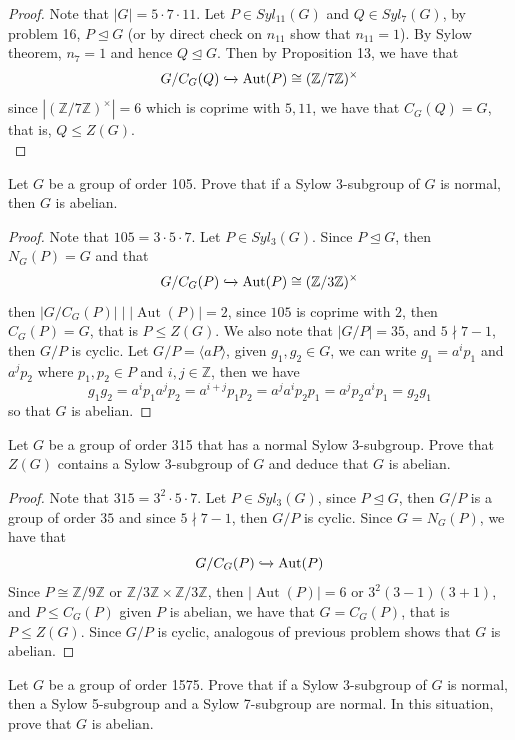 \documentclass{article}
\newcommand{\Z}{\mathbb{Z}}
\newenvironment{problem}[2][Problem]{\begin{trivlist}
\item[\hskip \labelsep {\bfseries #1}\hskip \labelsep {\bfseries #2.}]}{\end{trivlist}}
\DeclareMathOperator{\Aut}{Aut}
\begin{document}
\begin{proof}
    Note that $|G|=5\cdot 7 \cdot 11$. Let $P\in Syl_{11}(G)$ and $Q\in Syl_{7}(G)$, by problem 16, $P\trianglelefteq G$ (or by direct check on $n_{11}$ show that $n_{11}=1$). By Sylow theorem, $n_{7}=1$ and hence $Q\trianglelefteq G$. Then by Proposition 13, we have that 
    \[
        G/C_G(Q) \xhookrightarrow{} \Aut(P) \cong (\Z/7\Z)^{\times}
    \]
    since $|(\Z/7\Z)^{\times}|=6$ which is coprime with $5, 11$, we have that $C_G(Q)=G$, that is, $Q\leq Z(G)$.\\
\end{proof}
\begin{problem}{26}
        Let $G$ be a group of order 105. Prove that if a Sylow 3-subgroup of $G$ is normal, then $G$ is abelian.
\end{problem}
\begin{proof}
    Note that $105 = 3 \cdot 5 \cdot 7$. Let $P\in Syl_3(G)$. Since $P\trianglelefteq G$, then $N_G(P)=G$ and that 
    \[
        G/C_G(P)\xhookrightarrow{} \Aut(P)\cong (\Z/3\Z)^{\times}
    \]
    then $|G/C_G(P)|\mid |\Aut(P)|=2$, since $105$ is coprime with $2$, then $C_G(P)=G$, that is $P\leq Z(G)$. We also note that $|G/P|=35$, and $5\nmid 7-1$, then $G/P$ is cyclic. Let $G/P=\langle a P \rangle$, given $g_1, g_2\in G$, we can write $g_1 = a^ip_1$ and $a^jp_2$ where $p_1, p_2\in P$ and $i, j\in \Z$, then we have
    \[
    g_1g_2 =a^ip_1a^jp_2=a^{i+j}p_1p_2=a^{j}a^ip_2p_1=a^jp_2a^ip_1=g_2g_1
    \]
    so that $G$ is abelian.
\end{proof}
\begin{problem}{27}
        Let $G$ be a group of order 315 that has a normal Sylow 3-subgroup. Prove that $Z(G)$ contains a Sylow 3-subgroup of $G$ and deduce that $G$ is abelian.
\end{problem}
\begin{proof}
    Note that $315 = 3^2 \cdot 5 \cdot 7$. Let $P\in Syl_3(G)$, since $P\trianglelefteq G$, then $G/P$ is a group of order $35$ and since $5 \nmid 7-1$, then $G/P$ is cyclic. Since $G=N_G(P)$, we have that 
    \[
        G/C_G(P)\xhookrightarrow{} \Aut(P)
    \]
    Since $P\cong \Z/9\Z$ or $\Z/3\Z\times \Z/3\Z$, then $|\Aut(P)|=6$ or $3^2(3-1)(3+1)$, and $P\leq C_G(P)$ given $P$ is abelian, we have that $G=C_G(P)$, that is $P\leq Z(G)$. Since $G/P$ is cyclic, analogous of previous problem shows that $G$ is abelian.
\end{proof}
\begin{problem}{28}
         Let $G$ be a group of order 1575. Prove that if a Sylow 3-subgroup of $G$ is normal, then a Sylow 5-subgroup and a Sylow 7-subgroup are normal. In this situation, prove that $G$ is abelian.
\end{problem}
\end{document}
